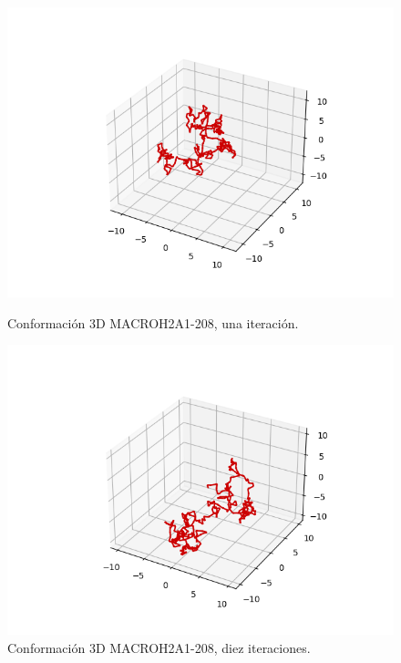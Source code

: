 \documentclass[a4paper,11pt,titlepage]{article}
\theoremstyle{definition}
\begin{document}
\begin{figure}[H]
    \centering
    \begin{minipage}[c]{0.31\textwidth}
        \centering
        \includegraphics[width=\textwidth]{images/MACROH2A1-208-db_one.png}
        \caption{Conformación 3D MACROH2A1-208, una iteración.}
        \label{fig:MACROH2A1-208-one}
    \end{minipage}
    \hfill
    \begin{minipage}[c]{0.31\textwidth}
        \centering
        \includegraphics[width=\textwidth]{images/MACROH2A1-208-db_iter.png}
        \caption{Conformación 3D MACROH2A1-208, diez iteraciones.}
        \label{fig:MACROH2A1-208-multi}
    \end{minipage}

\end{figure}
\end{document}
